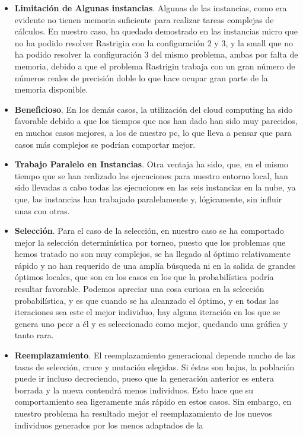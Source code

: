 \documentclass[runningheads]{llncs}
\begin{document}
\begin{itemize}
 \item \textbf{Limitación de Algunas instancias}. Algunas de las instancias, como era evidente no tienen memoria suficiente para realizar tareas complejas de cálculos. En 
 nuestro caso, ha quedado demostrado en las instancias micro que no ha podido resolver Rastrigin con la configuración 2 y 3, y 
 la small que no ha podido resolver la configuración 3 del mismo problema, ambas por falta de memoria, debido a que el problema 
 Rastrigin trabaja con un gran número de números reales de precisión doble lo que hace ocupar gran parte de la memoria disponible.
 \item \textbf{Beneficioso}. En los demás casos, la utilización del cloud computing ha sido favorable debido a que los tiempos que nos han dado 
 han sido muy parecidos, en muchos casos mejores, a los de nuestro pc, lo que lleva a pensar que para casos más complejos 
 se podrían comportar mejor.
 \item \textbf{Trabajo Paralelo en Instancias}. Otra ventaja ha sido, que, en el mismo tiempo que se han realizado las ejecuciones para nuestro entorno local, han sido 
 llevadas a cabo todas las ejecuciones en las seis instancias en la nube, ya que, las instancias han trabajado paralelamente y,
 lógicamente, sin influir unas con otras.
 \item \textbf{Selección}. Para el caso de la selección, en nuestro caso se ha comportado mejor la selección determinística por torneo, puesto que 
 los problemas que hemos tratado no son muy complejos, se ha llegado al óptimo relativamente rápido y no han requerido de una 
 amplía búsqueda ni en la salida de grandes óptimos locales, que son en los casos en los que la probabilística podría 
 resultar favorable. Podemos apreciar una cosa curiosa en la selección probabilística, y es que cuando se ha alcanzado el óptimo, 
 y en todas las iteraciones sea este el mejor individuo, hay alguna iteración en los que se genera uno peor a él y es seleccionado 
 como mejor, quedando una gráfica y tanto rara.
 \item \textbf{Reemplazamiento}. El reemplazamiento generacional depende mucho de las tasas de selección, cruce y mutación elegidas. 
 Si éstas son bajas, la población puede ir incluso decreciendo, pueso que la generación anterior es entera borrada y 
 la nueva contendrá menos individuos. Esto hace que su comportamiento sea ligeramente más rápido en estos casos. Sin embargo, 
 en nuestro problema ha resultado mejor el reemplazamiento de los nuevos individuos generados por los menos adaptados de la 

\end{itemize}
\end{document}

